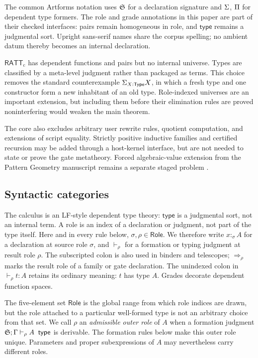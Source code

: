 \documentclass[11pt]{article}
\numberwithin{equation}{section}
\theoremstyle{definition}
\theoremstyle{plain}
\theoremstyle{remark}
\newcommand{\RATT}{\mathsf{RATT}_{\mathrm c}}
\newcommand{\Type}{\mathsf{type}}
\newcommand{\Role}{\mathsf{Role}}
\newcommand{\jtype}{\mathrel{\mathsf{type}}}
\begin{document}
The common Artforms notation uses \({\mathfrak S}\) for a declaration
signature and \(\Sigma\), \(\Pi\) for dependent type formers.  The
role and grade annotations in this paper are part of their checked
interfaces: pairs remain homogeneous in role, and \(\Type\) remains a
judgmental sort.  Upright sans-serif names share the corpus spelling; no
ambient datum thereby becomes an internal declaration.

\(\RATT\) has dependent functions and pairs but no internal universe.  Types
are classified by a meta-level judgment rather than packaged as terms.  This
choice removes the standard counterexample
\(
  \Sigma_{X:\mathsf{Type}}X
\), in which a fresh type and one constructor form a new inhabitant of an old
type.  Role-indexed universes are an important extension, but including them
before their elimination rules are proved noninterfering would weaken the main
theorem.

The core also excludes arbitrary user rewrite rules, quotient computation,
and extensions of script equality.  Strictly positive inductive families and
certified recursion may be added through a host-kernel interface, but are not
needed to state or prove the gate metatheory.  Forced algebraic-value
extension from the Pattern Geometry manuscript remains a separate staged
problem \cite{PatternGeometry}.

\subsection{Syntactic categories}

The calculus is an LF-style dependent type theory: \(\Type\) is a judgmental
sort, not an internal term.  A role is an index of a declaration or judgment,
not part of the type itself.  Here and in every rule below,
\(\sigma,\rho\in\Role\).  We therefore write \(x:_{\sigma}A\) for a
declaration at source role \(\sigma\), and \(\vdash_{\rho}\) for a formation
or typing judgment at result role \(\rho\).  The subscripted colon is also
used in binders and telescopes; \(\Rightarrow_{\rho}\) marks the result role
of a family or gate declaration.  The unindexed colon in
\(\vdash_{\rho}t:A\) retains its ordinary meaning: \(t\) has type \(A\).
Grades decorate dependent function spaces.

The five-element set \(\Role\) is the global range from which role indices
are drawn, but the role attached to a particular well-formed type is not an
arbitrary choice from that set.  We call \(\rho\) an \emph{admissible outer
role} of \(A\) when a formation judgment
\(\AFDeclSignature;\Gamma\vdash_{\rho}A\;\jtype\) is derivable.  The formation rules
below make this outer role unique.  Parameters and proper subexpressions of
\(A\) may nevertheless carry different roles.
\end{document}
